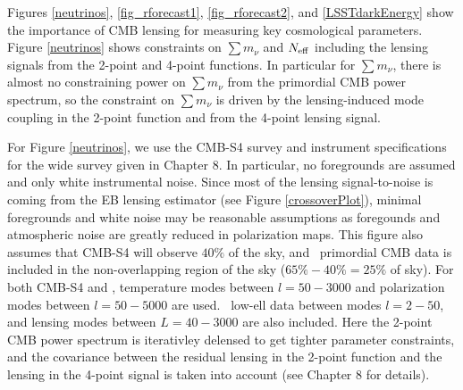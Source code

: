 

Figures \ref{neutrinos}, \ref{fig_rforecast1},   \ref{fig_rforecast2},  and \ref{LSSTdarkEnergy} show the importance of CMB lensing for measuring key cosmological parameters.  Figure \ref{neutrinos} shows constraints on $\sum {m_\nu}$ and $N_{\rm{eff}}$ including the lensing signals from the 2-point and 4-point functions.  In particular for $\sum {m_\nu}$, there is almost no constraining power on $\sum {m_\nu}$ from the primordial CMB power spectrum, so the constraint on $\sum {m_\nu}$ is driven by the lensing-induced mode coupling in the 2-point function and from the 4-point lensing signal.  

For Figure \ref{neutrinos}, we use the CMB-S4 survey and instrument specifications for the wide survey given in Chapter 8.  In particular, no foregrounds are assumed and only white instrumental noise.  Since most of the lensing signal-to-noise is coming from the EB lensing estimator (see Figure \ref{crossoverPlot}), minimal foregrounds and white noise may be reasonable assumptions as foregounds and atmospheric noise are greatly reduced in polarization maps.  This figure also assumes that CMB-S4 will observe $40\%$ of the sky, and \planck\ primordial CMB data is included in the non-overlapping region of the sky ($65\% - 40\% = 25\%$ of sky).  For both CMB-S4 and \planck, temperature modes between $l=50-3000$ and polarization modes between $l=50-5000$ are used.  \planck\ low-ell data between modes $l=2-50$, and lensing modes between $L=40-3000$ are also included.  Here the 2-point CMB power spectrum is iterativley delensed to get tighter parameter constraints, and the covariance between the residual lensing in the 2-point function and the lensing in the 4-point signal is taken into account (see Chapter 8 for details).     


